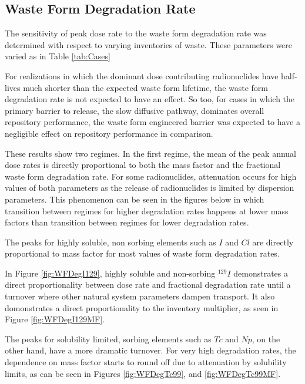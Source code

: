 
\subsection{Waste Form Degradation Rate}

The sensitivity of peak dose rate to the waste form degradation rate was 
determined with respect to varying inventories of waste. These parameters were 
varied as in Table \ref{tab:Cases}

For realizations in which the dominant dose contributing 
radionuclides have half-lives much shorter than the expected waste form lifetime, 
the waste form degradation rate is not expected to have an effect. So too, for 
cases in which the primary barrier to release, the slow diffusive pathway, 
dominates overall repository performance, the waste form engineered barrier was
expected to have a negligible effect on repository performance in comparison.

These results show two regimes. In the first regime, the mean of the peak annual 
dose rates is directly proportional to both the mass factor and the fractional 
waste form degradation rate. For some radionuclides, attenuation occurs for high 
values of both parameters as the release of radionuclides is limited by 
dispersion parameters. This phenomenon can be seen in the figures below in which 
transition between regimes for higher degradation rates happens at lower mass 
factors than transition between regimes for lower degradation rates. 

The peaks for highly soluble, non sorbing elements such as $I$ and $Cl$
are directly proportional to mass factor for most 
values of waste form degradation rates. 

In Figure \ref{fig:WFDegI129}, highly soluble and non-sorbing $^{129}I$ 
demonstrates a direct proportionality between dose rate and fractional 
degradation rate until a turnover where other natural system parameters dampen 
transport. It also domonstrates a direct proportionality to the inventory 
multiplier, as seen in Figure \ref{fig:WFDegI129MF}. 

The peaks for solubility limited, sorbing elements such as $Tc$ and $Np$, on the 
other hand, have a more dramatic turnover.  For very high degradation rates, the 
dependence on mass factor starts to round off due to attenuation by solubility 
limits, as can be seen in Figures 
\ref{fig:WFDegTc99}, and \ref{fig:WFDegTc99MF}.

